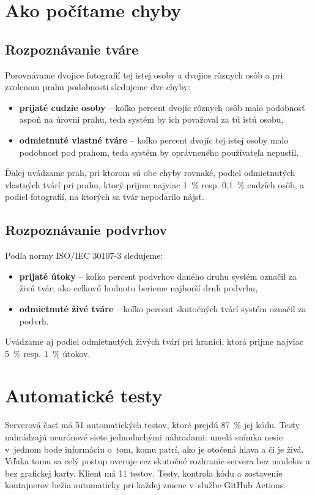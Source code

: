 \documentclass[12pt,a4paper,oneside]{report}
\begin{document}
\section{Ako počítame chyby}

\subsection*{Rozpoznávanie tváre}
Porovnávame dvojice fotografií tej istej osoby a dvojice rôznych osôb a pri zvolenom
prahu podobnosti sledujeme dve chyby:
\begin{itemize}
  \item \textbf{prijaté cudzie osoby} -- koľko percent dvojíc rôznych osôb malo podobnosť
        aspoň na úrovni prahu, teda systém by ich považoval za tú istú osobu,
  \item \textbf{odmietnuté vlastné tváre} -- koľko percent dvojíc tej istej osoby malo
        podobnosť pod prahom, teda systém by oprávneného používateľa nepustil.
\end{itemize}
Ďalej uvádzame prah, pri ktorom sú obe chyby rovnaké, podiel odmietnutých vlastných
tvárí pri prahu, ktorý prijme najviac 1~\% resp. 0,1~\% cudzích osôb, a podiel
fotografií, na ktorých sa tvár nepodarilo nájsť.

\subsection*{Rozpoznávanie podvrhov}
Podľa normy ISO/IEC 30107-3 \cite{iso30107-3} sledujeme:
\begin{itemize}
  \item \textbf{prijaté útoky} -- koľko percent podvrhov daného druhu systém označil za
        živú tvár; ako celkovú hodnotu berieme najhorší druh podvrhu,
  \item \textbf{odmietnuté živé tváre} -- koľko percent skutočných tvárí systém označil
        za podvrh.
\end{itemize}
Uvádzame aj podiel odmietnutých živých tvárí pri hranici, ktorá prijme najviac 5~\%
resp. 1~\% útokov.

\section{Automatické testy}

Serverová časť má 51 automatických testov, ktoré prejdú 87~\% jej kódu. Testy nahrádzajú
neurónové siete jednoduchými náhradami: umelá snímka nesie v~jednom bode informáciu
o~tom, komu patrí, ako je otočená hlava a či je živá. Vďaka tomu sa celý postup overuje
cez skutočné rozhranie servera bez modelov a bez grafickej karty. Klient má 11 testov.
Testy, kontrola kódu a zostavenie kontajnerov bežia automaticky pri každej zmene
v~službe GitHub Actions.
\end{document}
